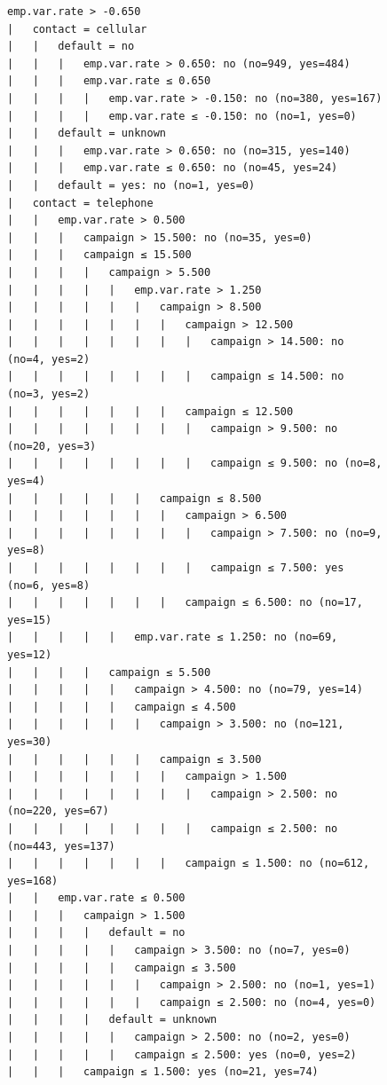 \documentclass[prodmode]{acmsmall} %
\begin{document}
\begin{figure}[!t]
    \begin{verbatim}
emp.var.rate > -0.650
|   contact = cellular
|   |   default = no
|   |   |   emp.var.rate > 0.650: no (no=949, yes=484)
|   |   |   emp.var.rate ≤ 0.650
|   |   |   |   emp.var.rate > -0.150: no (no=380, yes=167)
|   |   |   |   emp.var.rate ≤ -0.150: no (no=1, yes=0)
|   |   default = unknown
|   |   |   emp.var.rate > 0.650: no (no=315, yes=140)
|   |   |   emp.var.rate ≤ 0.650: no (no=45, yes=24)
|   |   default = yes: no (no=1, yes=0)
|   contact = telephone
|   |   emp.var.rate > 0.500
|   |   |   campaign > 15.500: no (no=35, yes=0)
|   |   |   campaign ≤ 15.500
|   |   |   |   campaign > 5.500
|   |   |   |   |   emp.var.rate > 1.250
|   |   |   |   |   |   campaign > 8.500
|   |   |   |   |   |   |   campaign > 12.500
|   |   |   |   |   |   |   |   campaign > 14.500: no (no=4, yes=2)
|   |   |   |   |   |   |   |   campaign ≤ 14.500: no (no=3, yes=2)
|   |   |   |   |   |   |   campaign ≤ 12.500
|   |   |   |   |   |   |   |   campaign > 9.500: no (no=20, yes=3)
|   |   |   |   |   |   |   |   campaign ≤ 9.500: no (no=8, yes=4)
|   |   |   |   |   |   campaign ≤ 8.500
|   |   |   |   |   |   |   campaign > 6.500
|   |   |   |   |   |   |   |   campaign > 7.500: no (no=9, yes=8)
|   |   |   |   |   |   |   |   campaign ≤ 7.500: yes (no=6, yes=8)
|   |   |   |   |   |   |   campaign ≤ 6.500: no (no=17, yes=15)
|   |   |   |   |   emp.var.rate ≤ 1.250: no (no=69, yes=12)
|   |   |   |   campaign ≤ 5.500
|   |   |   |   |   campaign > 4.500: no (no=79, yes=14)
|   |   |   |   |   campaign ≤ 4.500
|   |   |   |   |   |   campaign > 3.500: no (no=121, yes=30)
|   |   |   |   |   |   campaign ≤ 3.500
|   |   |   |   |   |   |   campaign > 1.500
|   |   |   |   |   |   |   |   campaign > 2.500: no (no=220, yes=67)
|   |   |   |   |   |   |   |   campaign ≤ 2.500: no (no=443, yes=137)
|   |   |   |   |   |   |   campaign ≤ 1.500: no (no=612, yes=168)
|   |   emp.var.rate ≤ 0.500
|   |   |   campaign > 1.500
|   |   |   |   default = no
|   |   |   |   |   campaign > 3.500: no (no=7, yes=0)
|   |   |   |   |   campaign ≤ 3.500
|   |   |   |   |   |   campaign > 2.500: no (no=1, yes=1)
|   |   |   |   |   |   campaign ≤ 2.500: no (no=4, yes=0)
|   |   |   |   default = unknown
|   |   |   |   |   campaign > 2.500: no (no=2, yes=0)
|   |   |   |   |   campaign ≤ 2.500: yes (no=0, yes=2)
|   |   |   campaign ≤ 1.500: yes (no=21, yes=74)
\end{verbatim}
\end{figure}


\end{document}
